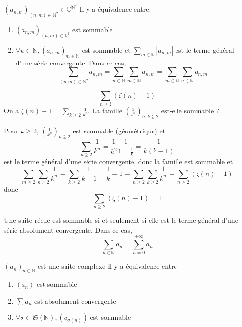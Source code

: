 \begin{cor}
    \Hyp $(a_{n, m})_{(n, m)\in\mathbb N^2}\in\mathbb C^{\mathbb N^2}$
    \Conc Il y a équivalence entre: \begin{enumerate}[left=1.2cm,label=\alph{enumi}.]
        \item $(a_{n,m})_{(n,m)\in\mathbb N^2}$ est sommable
        \item $\forall n\in\mathbb N, (a_{n, m})_{m\in\mathbb N}$ est sommable et $\sum_{m\in\mathbb N}|a_{n,m}|$ est le terme général d'une série convergente. Dans ce cas, \[
                \sum_{(n, m)\in\mathbb N^2}a_{n, m}=\sum_{n\in\mathbb N}\sum_{m\in\mathbb N}a_{n,m}=\sum_{m\in\mathbb N}\sum_{n\in\mathbb N}a_{n, m}
            \]
    \end{enumerate}
\end{cor}

\begin{ex}
    \[
        \sum_{n\geq 2}(\zeta(n)-1)
    \]
    On a $\zeta(n)-1=\sum_{k\geq 2}\frac1{k^n}$. La famille $\displaystyle \left( \frac1{k^n} \right)_{n, k\geq 2}$ est-elle sommable ?

    Pour $k\geq 2$, $\left(\frac1{k^n}\right)_{n\geq 2}$ est sommable (géométrique) et \[
        \sum_{n\geq 2}\frac1{k^n}=\frac1{k^2}\frac1{1-\frac1k}=\frac1{k(k-1)}
    \] est le terme général d'une série convergente, donc la famille est sommable et \[
    \sum_{m\geq 2}\sum_{n\geq 2}\frac1{k^n}=\sum_{k\geq 2}\frac1{k-1}-\frac1k=1=\sum_{n\geq 2}\sum_{k\geq 2}\frac1{k^n}=\sum_{n\geq 2}(\zeta(n)-1)
\]
donc \[
    \sum_{n\geq 2}(\zeta(n)-1)=1
\]
\end{ex}

\begin{rem}
    Une suite réelle est sommable si et seulement si elle est le terme général d'une série absolument convergente. Dans ce cas, \[
        \sum_{n\in\mathbb N}a_n=\sum_{n=0}^{+\infty}a_n
    \]
\end{rem}

\begin{prop}
    \Hyp $(a_n)_{n\in\mathbb N}$ est une suite complexe
    \Conc Il y a équivalence entre \begin{enumerate}[left=1.2cm,label=\alph{enumi}.]
        \item $(a_n)$ est sommable
        \item $\sum a_n$ est absolument convergente
        \item $\forall \sigma\in\mathfrak S(\mathbb N), (a_{\sigma(n)})$ est sommable
    \end{enumerate}
\end{prop}

